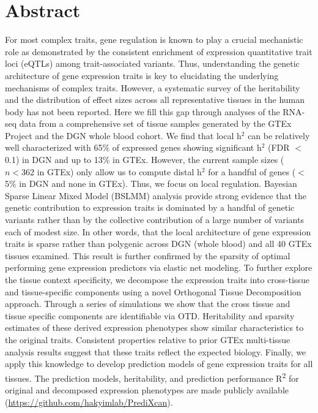 \documentclass[10pt,letterpaper]{article}
\begin{document}
\pagebreak{}

\section*{Abstract}
For most complex traits, gene regulation is known to play a crucial mechanistic role as demonstrated by the consistent enrichment of expression quantitative trait loci (eQTLs) among trait-associated variants. Thus, understanding the genetic architecture of gene expression traits is key to elucidating the underlying mechanisms of complex traits. However, a systematic survey of the heritability and the distribution of effect sizes across all representative tissues in the human body has not been reported. Here we fill this gap through analyses of the RNA-seq data from a comprehensive set of tissue samples generated by the GTEx Project and the DGN whole blood cohort. We find that local h$^2$ can be relatively well characterized with 65\% of expressed genes showing significant h$^2$ (FDR $<$ 0.1) in DGN and up to 13\% in GTEx. However, the current sample sizes ($n<362$ in GTEx) only allow us to compute distal h$^2$ for a handful of genes ($<$5\% in DGN and none in GTEx). Thus, we focus on local regulation. Bayesian Sparse Linear Mixed Model (BSLMM) analysis provide strong evidence that the genetic contribution to expression traits is dominated by a handful of genetic variants rather than by the collective contribution of a large number of variants each of modest size. In other words, that the local architecture of gene expression traits is sparse rather than polygenic across DGN (whole blood) and all 40 GTEx tissues examined. This result is further confirmed by the sparsity of optimal performing gene expression predictors via elastic net modeling. To further explore the tissue context specificity, we decompose the expression traits into cross-tissue and tissue-specific components using a novel Orthogonal Tissue Decomposition approach. Through a series of simulations we show that the cross tissue and tissue specific components are identifiable via OTD. Heritability and sparsity estimates of these derived expression phenotypes show similar characteristics to the original traits. Consistent properties relative to prior GTEx multi-tissue analysis results suggest that these traits reflect the expected biology. Finally, we apply this knowledge to develop prediction models of gene expression traits for all tissues. The prediction models, heritability, and prediction performance R\textsuperscript{2} for original and decomposed expression phenotypes are made publicly available (\url{https://github.com/hakyimlab/PrediXcan}).
\end{document}
